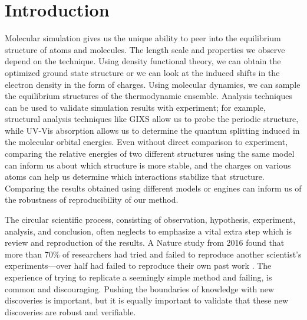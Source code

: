 \chapter{Introduction}

Molecular simulation gives us the unique ability to peer into the equilibrium structure of atoms and molecules.
The length scale and properties we observe depend on the technique.
Using density functional theory, we can obtain the optimized ground state structure or we can look at the induced shifts in the electron density in the form of charges.
Using molecular dynamics, we can sample the equilibrium structures of the thermodynamic ensemble. 
Analysis techniques can be used to validate simulation results with experiment; for example, structural analysis techniques like GIXS allow us to probe the periodic structure, while UV-Vis absorption allows us to determine the quantum splitting induced in the molecular orbital energies.
Even without direct comparison to experiment, comparing the relative energies of two different structures using the same model can inform us about which structure is more stable, and the charges on various atoms can help us determine which interactions stabilize that structure.
Comparing the results obtained using different models or engines can inform us of the robustness of reproducibility of our method.

The circular scientific process, consisting of observation, hypothesis, experiment, analysis, and conclusion, often neglects to emphasize a vital extra step which is review and reproduction of the results. 
A Nature study from 2016 found that more than 70\% of researchers had tried and failed to reproduce another scientist’s experiments---over half had failed to reproduce their own past work \cite{Baker2016}.
The experience of trying to replicate a seemingly simple method and failing, is common and discouraging.
Pushing the boundaries of knowledge with new discoveries is important, but it is equally important to validate that these new discoveries are robust and verifiable.

